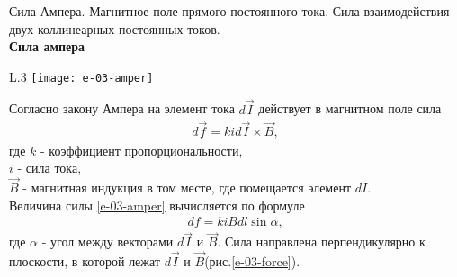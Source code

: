 \documentclass[__main__.tex]{subfiles}
\begin{document}
Сила Ампера. Магнитное поле прямого постоянного тока. Сила взаимодействия двух коллинеарных постоянных токов.\\ 

\textbf{Сила ампера}\\

\begin{wrapfigure}{L}{.3\linewidth}
	\texttt{[image: e-03-amper]}
	\caption{Сила Ампера}
	\label{e-03-force}
\end{wrapfigure}
Согласно закону Ампера на элемент тока $d\vec{I}$ действует в магнитном поле сила
\begin{gather}
	d\vec{f} = kid\vec{I} \times \vec{B},
	\label{e-03-amper}
\end{gather}
где $k$ - коэффициент пропорциональности,\\
$i$ - сила тока,\\
$\vec{B}$ - магнитная индукция в том месте, где помещается элемент $dI$.\\
Величина силы \ref{e-03-amper} вычисляется по формуле 
\begin{gather}
	df = kiBdl\sin{\alpha},
\end{gather}
где $\alpha$ - угол между векторами $d\vec{I}$ и $\vec{B}$. Сила направлена перпендикулярно к плоскости, в которой лежат $d\vec{I}$ и $\vec{B}$(рис.\ref{e-03-force}).\\
\end{document}
